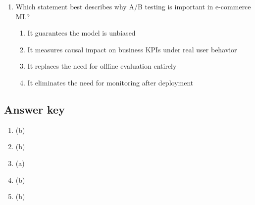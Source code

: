 \begin{enumerate}
  \item Which statement best describes why A/B testing is important in e-commerce ML?
  \begin{enumerate}
    \item It guarantees the model is unbiased
    \item It measures causal impact on business KPIs under real user behavior
    \item It replaces the need for offline evaluation entirely
    \item It eliminates the need for monitoring after deployment
  \end{enumerate}
\end{enumerate}

\subsection*{Answer key}
\begin{enumerate}
  \item (b)
  \item (b)
  \item (a)
  \item (b)
  \item (b)
\end{enumerate}
